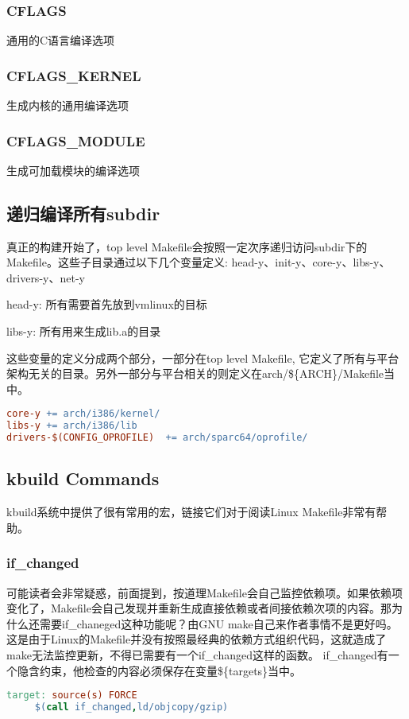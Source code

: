\subsubsection{CFLAGS}
通用的C语言编译选项
\subsubsection{CFLAGS\_KERNEL}
生成内核的通用编译选项
\subsubsection{CFLAGS\_MODULE}
生成可加载模块的编译选项
\subsection{递归编译所有subdir}
真正的构建开始了，top level Makefile会按照一定次序递归访问subdir下的Makefile。这些子目录通过以下几个变量定义:
head-y、init-y、core-y、libs-y、drivers-y、net-y
\begin{compactenum}
\item head-y: 所有需要首先放到vmlinux的目标
\item libs-y: 所有用来生成lib.a的目录
\end{compactenum}
这些变量的定义分成两个部分，一部分在top level Makefile, 它定义了所有与平台架构无关的目录。另外一部分与平台相关的则定义在arch/\$\{ARCH\}/Makefile当中。
\begin{lstlisting}[language=make]
core-y += arch/i386/kernel/
libs-y += arch/i386/lib
drivers-$(CONFIG_OPROFILE)  += arch/sparc64/oprofile/
\end{lstlisting}

\subsection{kbuild Commands}
kbuild系统中提供了很有常用的宏，链接它们对于阅读Linux Makefile非常有帮助。
\subsubsection{if\_changed}
可能读者会非常疑惑，前面提到，按道理Makefile会自己监控依赖项。如果依赖项变化了，Makefile会自己发现并重新生成直接依赖或者间接依赖次项的内容。那为什么还需要if\_chaneged这种功能呢？由GNU make自己来作者事情不是更好吗。
这是由于Linux的Makefile并没有按照最经典的依赖方式组织代码，这就造成了make无法监控更新，不得已需要有一个if\_changed这样的函数。
if\_changed有一个隐含约束，他检查的内容必须保存在变量\$\{targets\}当中。
\begin{lstlisting}[language=make]
 target: source(s) FORCE
     $(call if_changed,ld/objcopy/gzip)
\end{lstlisting}

